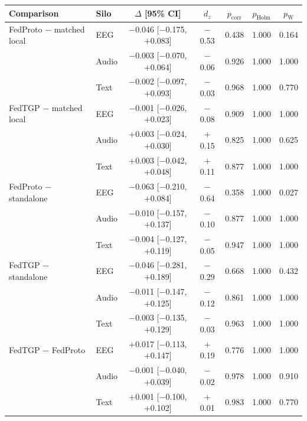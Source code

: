 \begin{tabular}{llccccc}
\toprule
\textbf{Comparison} & \textbf{Silo} & \textbf{$\Delta$ [95\% CI]} & \textbf{$d_z$} & \textbf{$p_{\mathrm{corr}}$} & \textbf{$p_{\mathrm{Holm}}$} & \textbf{$p_{\mathrm{W}}$} \\
\midrule
FedProto $-$ matched local & EEG & $-$0.046 [$-$0.175, $+$0.083] & $-$0.53 & 0.438 & 1.000 & 0.164 \\
 & Audio & $-$0.003 [$-$0.070, $+$0.064] & $-$0.06 & 0.926 & 1.000 & 1.000 \\
 & Text & $-$0.002 [$-$0.097, $+$0.093] & $-$0.03 & 0.968 & 1.000 & 0.770 \\
\midrule
FedTGP $-$ matched local & EEG & $-$0.001 [$-$0.026, $+$0.023] & $-$0.08 & 0.909 & 1.000 & 1.000 \\
 & Audio & $+$0.003 [$-$0.024, $+$0.030] & $+$0.15 & 0.825 & 1.000 & 0.625 \\
 & Text & $+$0.003 [$-$0.042, $+$0.048] & $+$0.11 & 0.877 & 1.000 & 1.000 \\
\midrule
FedProto $-$ standalone & EEG & $-$0.063 [$-$0.210, $+$0.084] & $-$0.64 & 0.358 & 1.000 & 0.027 \\
 & Audio & $-$0.010 [$-$0.157, $+$0.137] & $-$0.10 & 0.877 & 1.000 & 1.000 \\
 & Text & $-$0.004 [$-$0.127, $+$0.119] & $-$0.05 & 0.947 & 1.000 & 1.000 \\
\midrule
FedTGP $-$ standalone & EEG & $-$0.046 [$-$0.281, $+$0.189] & $-$0.29 & 0.668 & 1.000 & 0.432 \\
 & Audio & $-$0.011 [$-$0.147, $+$0.125] & $-$0.12 & 0.861 & 1.000 & 1.000 \\
 & Text & $-$0.003 [$-$0.135, $+$0.129] & $-$0.03 & 0.963 & 1.000 & 1.000 \\
\midrule
FedTGP $-$ FedProto & EEG & $+$0.017 [$-$0.113, $+$0.147] & $+$0.19 & 0.776 & 1.000 & 1.000 \\
 & Audio & $-$0.001 [$-$0.040, $+$0.039] & $-$0.02 & 0.978 & 1.000 & 0.910 \\
 & Text & $+$0.001 [$-$0.100, $+$0.102] & $+$0.01 & 0.983 & 1.000 & 0.770 \\
\bottomrule
\end{tabular}